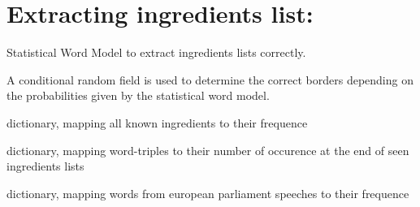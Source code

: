 \documentclass[letterpaper,10pt,english]{sphinxmanual}
\begin{document}
\section{Extracting ingredients list:}
\label{\detokenize{api:extracting-ingredients-list}}\label{\detokenize{api:module-ingredient_extractor}}

\begin{fulllineitems}
\label{\detokenize{api:ingredient_extractor.IngredientExtractor}}
Statistical Word Model to extract ingredients lists correctly.

A conditional random field is used to determine the correct
borders depending on the probabilities given by the statistical
word model.

\begin{fulllineitems}
\label{\detokenize{api:ingredient_extractor.IngredientExtractor.vocabulary}}
dictionary, mapping all known ingredients to their
frequence

\end{fulllineitems}


\begin{fulllineitems}
\label{\detokenize{api:ingredient_extractor.IngredientExtractor.trigram_model}}
dictionary, mapping word-triples to their number
of occurence at the end of seen ingredients lists

\end{fulllineitems}


\begin{fulllineitems}
\label{\detokenize{api:ingredient_extractor.IngredientExtractor.base_model}}
dictionary, mapping words from european parliament
speeches to their frequence


\end{fulllineitems}
\end{fulllineitems}
\end{document}
